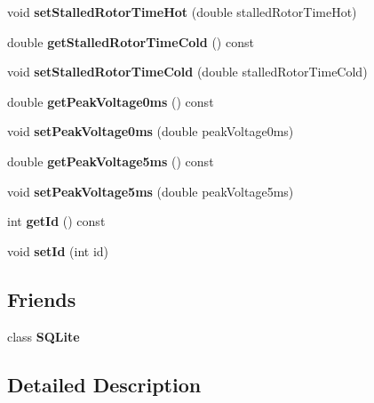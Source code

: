 \begin{DoxyCompactItemize}
void {\bfseries set\+Stalled\+Rotor\+Time\+Hot} (double stalled\+Rotor\+Time\+Hot)
\item 
\mbox{\label{class_motor_data_aa8ccd929fc9a25765440fb8b04e71a44}} 
double {\bfseries get\+Stalled\+Rotor\+Time\+Cold} () const
\item 
\mbox{\label{class_motor_data_ad52da7f0ac62233e71564023c22f6138}} 
void {\bfseries set\+Stalled\+Rotor\+Time\+Cold} (double stalled\+Rotor\+Time\+Cold)
\item 
\mbox{\label{class_motor_data_aef4147e64c402f7e89e295b050f302d3}} 
double {\bfseries get\+Peak\+Voltage0ms} () const
\item 
\mbox{\label{class_motor_data_ace2eb139ee2b7d070573ffd201853e41}} 
void {\bfseries set\+Peak\+Voltage0ms} (double peak\+Voltage0ms)
\item 
\mbox{\label{class_motor_data_a63cb35bd7064d68a989a84219b0f210a}} 
double {\bfseries get\+Peak\+Voltage5ms} () const
\item 
\mbox{\label{class_motor_data_a1556adb7bc4d3f92565e6fa3783e1d52}} 
void {\bfseries set\+Peak\+Voltage5ms} (double peak\+Voltage5ms)
\item 
\mbox{\label{class_motor_data_ac67a3f78e851968c9979e60cbf0f495b}} 
int {\bfseries get\+Id} () const
\item 
\mbox{\label{class_motor_data_ae26351f2cfd4e0acbd413b008ac2759f}} 
void {\bfseries set\+Id} (int id)
\end{DoxyCompactItemize}
\subsection*{Friends}
\begin{DoxyCompactItemize}
\item 
\mbox{\label{class_motor_data_a0102f3b3c0cbf96db6c49f071fa5e7cc}} 
class {\bfseries S\+Q\+Lite}
\end{DoxyCompactItemize}


\subsection{Detailed Description}


